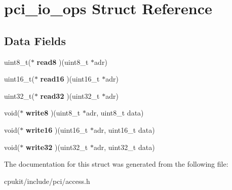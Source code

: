 \hypertarget{structpci__io__ops}{}\section{pci\+\_\+io\+\_\+ops Struct Reference}
\label{structpci__io__ops}
\subsection*{Data Fields}
\begin{DoxyCompactItemize}
\item 
\mbox{\label{structpci__io__ops_a90a7e004ffb9819d2904034785207289}} 
uint8\+\_\+t($\ast$ {\bfseries read8} )(uint8\+\_\+t $\ast$adr)
\item 
\mbox{\label{structpci__io__ops_afe2672fe8af2519aefa61cbfa18b1072}} 
uint16\+\_\+t($\ast$ {\bfseries read16} )(uint16\+\_\+t $\ast$adr)
\item 
\mbox{\label{structpci__io__ops_a5db9dc1f37e9e68cc5ef846ee1139288}} 
uint32\+\_\+t($\ast$ {\bfseries read32} )(uint32\+\_\+t $\ast$adr)
\item 
\mbox{\label{structpci__io__ops_a7e4902e1686a26c0a8c2e86bb9730665}} 
void($\ast$ {\bfseries write8} )(uint8\+\_\+t $\ast$adr, uint8\+\_\+t data)
\item 
\mbox{\label{structpci__io__ops_a0fe5792b0d6db33c65d0b5cca2358222}} 
void($\ast$ {\bfseries write16} )(uint16\+\_\+t $\ast$adr, uint16\+\_\+t data)
\item 
\mbox{\label{structpci__io__ops_a3bafb6bd095016340cb4ea357e3bcae0}} 
void($\ast$ {\bfseries write32} )(uint32\+\_\+t $\ast$adr, uint32\+\_\+t data)
\end{DoxyCompactItemize}


The documentation for this struct was generated from the following file\+:\begin{DoxyCompactItemize}
\item 
cpukit/include/pci/access.\+h\end{DoxyCompactItemize}
